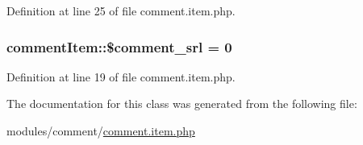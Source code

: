 Definition at line 25 of file comment.\+item.\+php.

\hypertarget{classcommentItem_aec6b057a6e1e71a7b1441fe12682af3b}{}
\subsubsection[{\$comment\+\_\+srl}]{\setlength{\rightskip}{0pt plus 5cm}comment\+Item\+::\$comment\+\_\+srl = 0}\label{classcommentItem_aec6b057a6e1e71a7b1441fe12682af3b}


Definition at line 19 of file comment.\+item.\+php.



The documentation for this class was generated from the following file\+:\begin{DoxyCompactItemize}
\item 
modules/comment/\hyperlink{comment_8item_8php}{comment.\+item.\+php}\end{DoxyCompactItemize}
